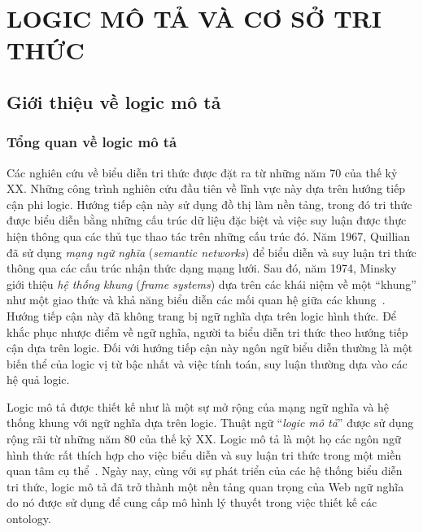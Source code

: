 \chapter[Logic mô tả và cơ sở tri thức]{LOGIC MÔ TẢ VÀ CƠ SỞ TRI THỨC}
\label{Chapter1}
\thispagestyle{fancy}

\section{Giới thiệu về logic mô tả}
\label{sec:Chap1.Introduction}
\subsection{Tổng quan về logic mô tả}
\label{sec:Chap1.Overview}
Các nghiên cứu về biểu diễn tri thức được đặt ra từ những năm 70 của thế kỷ XX. Những công trình nghiên cứu đầu tiên về lĩnh vực này dựa trên hướng tiếp cận phi logic. Hướng tiếp cận này sử dụng đồ thị làm nền tảng, trong đó tri thức được biểu diễn bằng những cấu trúc dữ liệu đặc biệt và việc suy luận được thực hiện thông qua các thủ tục thao tác trên những cấu trúc đó. Năm 1967, Quillian~\cite{Quillian1967} đã sử dụng {\em mạng ngữ nghĩa} ({\em semantic networks}) để biểu diễn và suy luận tri thức thông qua các cấu trúc nhận thức dạng mạng lưới. Sau đó, năm 1974, Minsky giới thiệu {\em hệ thống khung} ({\em frame systems}) dựa trên các khái niệm về một ``khung'' như một giao thức và khả năng biểu diễn các mối quan hệ giữa các khung~\cite{Minski1974}. Hướng tiếp cận này đã không trang bị ngữ nghĩa dựa trên logic hình thức. Để khắc phục nhược điểm về ngữ nghĩa, người ta biểu diễn tri thức theo hướng tiếp cận dựa trên logic. Đối với hướng tiếp cận này ngôn ngữ biểu diễn thường là một biến thể của logic vị từ bậc nhất và việc tính toán, suy luận thường dựa vào các hệ quả logic.

Logic mô tả được thiết kế như là một sự mở rộng của mạng ngữ nghĩa và hệ thống khung với ngữ nghĩa dựa trên logic. Thuật ngữ ``{\em logic mô tả}'' được sử dụng rộng rãi từ những năm 80 của thế kỷ XX. Logic mô tả là một họ các ngôn ngữ hình thức rất thích hợp cho việc biểu diễn và suy luận tri thức trong một miền quan tâm cụ thể~\cite{DLHandbook2007}. Ngày nay, cùng với sự phát triển của các hệ thống biểu diễn tri thức, logic mô tả đã trở thành một nền tảng quan trọng của Web ngữ nghĩa do nó được sử dụng để cung cấp mô hình lý thuyết trong việc thiết kế các ontology.

